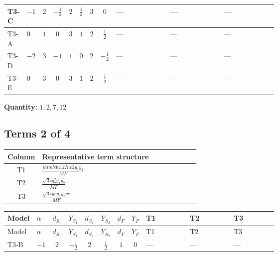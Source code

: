 \documentclass[8pt]{article}
\begin{document}
\begin{landscape}
\begin{longtable}{@{}llcccccc >{\raggedright\arraybackslash}p{0.21\linewidth} >{\raggedright\arraybackslash}p{0.21\linewidth} >{\raggedright\arraybackslash}p{0.21\linewidth}@{}}
\midrule
T3-C & $-1$ & $2$ & $-\frac{1}{2}$ & $2$ & $\frac{1}{2}$ & $3$ & $0$ & --- & --- & --- \\
\midrule
T3-A & $0$ & $1$ & $0$ & $3$ & $1$ & $2$ & $\frac{1}{2}$ & --- & --- & --- \\
\midrule
T3-D & $-2$ & $3$ & $-1$ & $1$ & $0$ & $2$ & $-\frac{1}{2}$ & --- & --- & --- \\
\midrule
T3-E & $0$ & $3$ & $0$ & $3$ & $1$ & $2$ & $\frac{1}{2}$ & --- & --- & --- \\
\midrule
\bottomrule
\end{longtable}
\clearpage
\noindent\textbf{Quantity: }$\mathrm{1,2,7,12}$\par\smallskip
\subsection*{Terms 2 of 4}
\begin{center}
\begin{tabular}{@{}c >{\raggedright\arraybackslash}p{0.82\linewidth}@{}}
\toprule
Column & Representative term structure \\
\midrule
T1 & \(\displaystyle \frac{i lambda12Inv2 \overline{y_{1}} \overline{y_{2}}}{MF}\) \\
\midrule
T2 & \(\displaystyle \frac{\sqrt{3} i g_{2}^{2} \overline{y_{1}} \overline{y_{2}}}{MF}\) \\
\midrule
T3 & \(\displaystyle \frac{\sqrt{3} i ye \overline{y_{1}} \overline{y_{2}} \overline{ye}}{MF}\) \\
\midrule
\bottomrule
\end{tabular}
\end{center}
\smallskip
\tiny
\begin{longtable}{@{}llcccccc >{\raggedright\arraybackslash}p{0.21\linewidth} >{\raggedright\arraybackslash}p{0.21\linewidth} >{\raggedright\arraybackslash}p{0.21\linewidth}@{}}
\toprule
Model & $\alpha$ & $d_{S_1}$ & $Y_{S_1}$ & $d_{S_2}$ & $Y_{S_2}$ & $d_F$ & $Y_F$ & T1 & T2 & T3 \\
\midrule
\endfirsthead
\toprule
Model & $\alpha$ & $d_{S_1}$ & $Y_{S_1}$ & $d_{S_2}$ & $Y_{S_2}$ & $d_F$ & $Y_F$ & T1 & T2 & T3 \\
\midrule
\endhead
T3-B & $-1$ & $2$ & $-\frac{1}{2}$ & $2$ & $\frac{1}{2}$ & $1$ & $0$ & --- & --- & --- \\
\midrule

\end{longtable}
\end{landscape}
\end{document}
